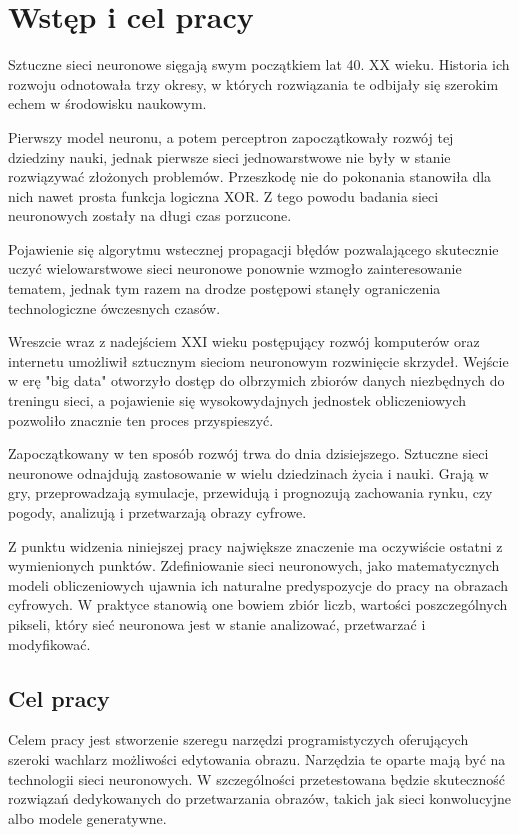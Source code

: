 \section{Wstęp i cel pracy}
  Sztuczne sieci neuronowe sięgają swym początkiem lat 40. XX wieku.
  Historia ich rozwoju odnotowała trzy okresy, w których rozwiązania te
  odbijały się szerokim echem w środowisku naukowym.

  Pierwszy model neuronu, a potem perceptron zapoczątkowały
  rozwój tej dziedziny nauki, jednak pierwsze sieci jednowarstwowe nie były w
  stanie rozwiązywać złożonych problemów. Przeszkodę nie do pokonania stanowiła
  dla nich nawet prosta funkcja logiczna XOR. Z tego powodu badania sieci
  neuronowych zostały na długi czas porzucone.


  Pojawienie się algorytmu wstecznej propagacji błędów
  pozwalającego skutecznie uczyć wielowarstwowe sieci neuronowe ponownie
  wzmogło zainteresowanie tematem, jednak tym razem na drodze postępowi stanęły
  ograniczenia technologiczne ówczesnych czasów.


  Wreszcie wraz z nadejściem XXI wieku postępujący rozwój
  komputerów oraz internetu umożliwił sztucznym sieciom neuronowym rozwinięcie
  skrzydeł. Wejście w erę "big data" otworzyło dostęp do olbrzymich zbiorów
  danych niezbędnych do treningu sieci, a pojawienie się wysokowydajnych
  jednostek obliczeniowych pozwoliło znacznie ten proces przyspieszyć.


  Zapoczątkowany w ten sposób rozwój trwa do dnia dzisiejszego.
  Sztuczne sieci neuronowe odnajdują zastosowanie w wielu dziedzinach życia i
  nauki. Grają w gry, przeprowadzają symulacje, przewidują i prognozują
  zachowania rynku, czy pogody, analizują i przetwarzają obrazy cyfrowe.


  Z punktu widzenia niniejszej pracy największe znaczenie ma
  oczywiście ostatni z wymienionych punktów. Zdefiniowanie sieci neuronowych,
  jako matematycznych modeli obliczeniowych ujawnia ich naturalne predyspozycje
  do pracy na obrazach cyfrowych. W praktyce stanowią one bowiem zbiór liczb,
  wartości poszczególnych pikseli, który sieć neuronowa jest w stanie
  analizować, przetwarzać i modyfikować.

  \subsection{Cel pracy}
    Celem pracy jest stworzenie szeregu narzędzi programistyczych
    oferujących szeroki wachlarz możliwości edytowania obrazu. Narzędzia te
    oparte mają być na technologii sieci neuronowych. W szczególności
    przetestowana będzie skuteczność rozwiązań dedykowanych do przetwarzania
    obrazów, takich jak sieci konwolucyjne albo modele generatywne.

